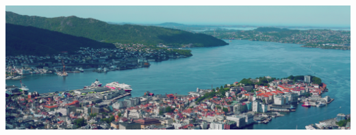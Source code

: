 \documentclass[10pt]{article}
\begin{document}
\begin{center}
\includegraphics[width=\textwidth,height=7cm]{images/bergen.jpg}
\end{center}
\end{document}
